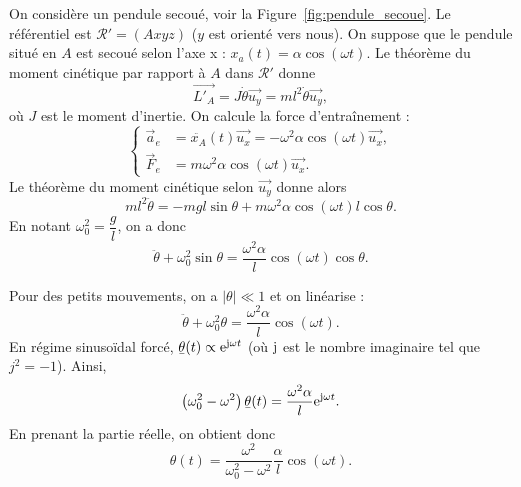            On considère un pendule secoué, voir la Figure~\ref{fig:pendule_secoue}. Le référentiel est $\mathcal{R}'=(Axyz)$ ($y$ est orienté vers nous). On suppose que le pendule situé en $A$ est secoué selon l'axe x : $x_{a}(t)=\alpha\cos(\omega t)$. Le théorème du moment cinétique par rapport à $A$ dans $\mathcal{R}'$ donne 
            \begin{equation*}
                \vec{L'_{A}}=J\dot{\theta}\vec{u_y}=ml^{2}\dot{\theta}\vec{u_y},
            \end{equation*}
            où $J$ est le moment d'inertie. On calcule la force d'entraînement :
            \begin{equation*}
                \left\lbrace
                \begin{aligned}
                    \vec{a}_e &=\ddot{x_A}(t)\vec{u_x}=-\omega^{2}\alpha\cos(\omega t)\vec{u_x},\\
                    \vec{F}_e &= m\omega^{2}\alpha\cos(\omega t)\vec{u_x}.
                \end{aligned}
                \right.
            \end{equation*}
            Le théorème du moment cinétique selon $\vec{u_y}$ donne alors
            \begin{equation*}
                ml^{2}\ddot{\theta}=-mgl\sin\theta+m\omega^{2}\alpha\cos(\omega t)l\cos\theta.
            \end{equation*}
            En notant $\omega_{0}^{2}=\dfrac{g}{l}$, on a donc 
            \begin{equation*}
                \boxed{
                    \ddot{\theta}+\omega_{0}^{2}\sin\theta=\frac{\omega^{2}\alpha}{l}\cos(\omega t)\cos\theta.
                }
            \end{equation*}

            Pour des petits mouvements, on a $\left\lvert\theta\right\rvert\ll1$ et on linéarise :
            \begin{equation*}
                \ddot{\theta}+\omega_{0}^{2}\theta=\frac{\omega^{2}\alpha}{l}\cos(\omega t).
            \end{equation*}
            En régime sinusoïdal forcé, $\ubar{\theta}(t)\propto\e^{\j \omega t}$ (où $\mathrm{j}$ est le nombre imaginaire tel que $j^{2}=-1$). Ainsi,
            \begin{equation*}
                \left(\omega_{0}^{2}-\omega^{2}\right)\ubar{\theta}(t)=\frac{\omega^{2}\alpha}{l}\e^{\j\omega t}.
            \end{equation*}
            En prenant la partie réelle, on obtient donc
            \begin{equation*}
                \boxed{
                    \theta(t)=\frac{\omega^{2}}{\omega_{0}^{2}-\omega^{2}}\frac{\alpha}{l}\cos(\omega t).
                }
            \end{equation*}

